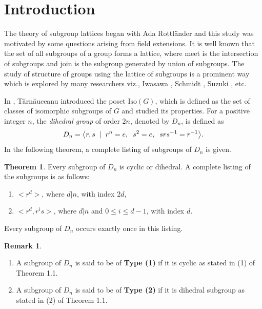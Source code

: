 \documentclass{article}
\theoremstyle{definition}
\newtheorem{theorem}{Theorem}[section]
\newtheorem{remark}{Remark}
\begin{document}
\section{Introduction}
The theory of subgroup lattices began with Ada Rottländer \cite{Ada} and this study was motivated by some questions arising from field extensions. It is well known that the set of all subgroups of a group forms a lattice, where meet is the intersection of subgroups and join is the subgroup generated by union of subgroups. The study of structure of groups using the lattice of subgroups is a prominent way which is explored by many researchers viz., Iwasawa \cite{iwasawa2001collected}, Schmidt \cite{Schmidt+1994}, Suzuki \cite{Suzuki1956}, etc. \par
In \cite{tarnauceanu2015posetsclassesisomorphicsubgroups}, Tărnăuceanu introduced the poset $\text{Iso}(G)$, which is defined as the set of classes of isomorphic subgroups of $G$ and studied its properties.
For a positive integer $n$, the \emph{dihedral group} of order
$2n$, denoted by $D_n$, is defined as
\begin{equation*}
    D_n=\bigl<r,s\hspace{0.2cm}|\hspace{0.2cm} r^n=e,\hspace{0.2cm}s^2=e,\hspace{0.2cm}srs^{-1}=r^{-1}\bigr>.
\end{equation*} 
In the following theorem, a complete listing of subgroups of $D_n$ is given.
\begin{theorem}
     \cite{conrad} Every subgroup of $D_n$ is cyclic or dihedral. A complete listing of the subgroups is as follows: 
\begin{enumerate}
    \item $\bigl<r^d\bigr>$, where $d|n$, with index $2d$,
    \item $\bigl<r^d,r^is\bigr>$, where $d|n$ and $0\le i\le d-1$, with index $d$.
\end{enumerate}
Every subgroup of $D_n$ occurs exactly once in this listing.
\end{theorem}
\begin{remark}
\begin{enumerate}
    \item A subgroup of $D_n$ is said to be of \textbf{Type (1)} if it is cyclic as stated in (1) of Theorem 1.1.
    \item A subgroup of $D_n$ is said to be of \textbf{Type (2)} if it is dihedral subgroup as stated in (2) of Theorem 1.1.
\end{enumerate}
\end{remark}
\end{document}
